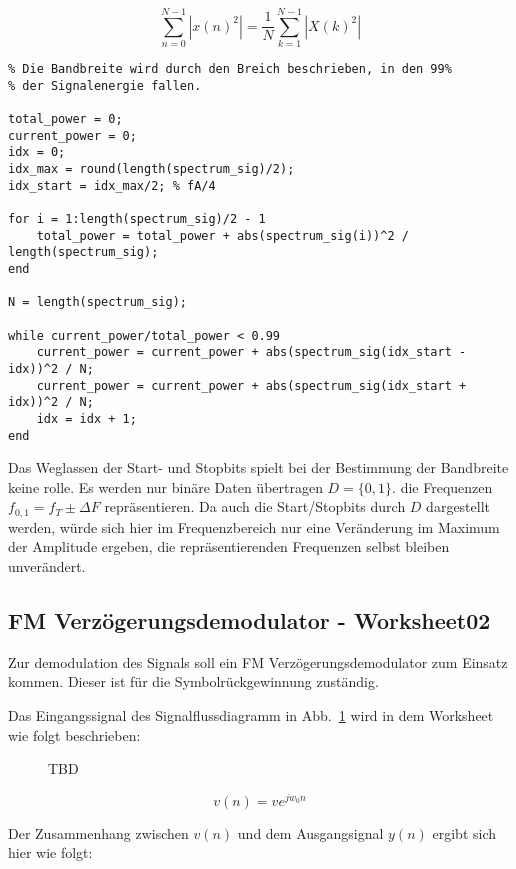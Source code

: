 \documentclass{article}
\begin{document}
$$
\sum_{n = 0}^{N - 1}\left\lvert x(n)^2\right\rvert =  \frac{1}{N} \sum_{k = 1}^{N-1}  \left\lvert X(k)^2\right\rvert 
$$
\begin{listing}
\begin{verbatim}
% Die Bandbreite wird durch den Breich beschrieben, in den 99%
% der Signalenergie fallen.

total_power = 0;
current_power = 0;
idx = 0;
idx_max = round(length(spectrum_sig)/2);
idx_start = idx_max/2; % fA/4

for i = 1:length(spectrum_sig)/2 - 1
    total_power = total_power + abs(spectrum_sig(i))^2 / length(spectrum_sig);
end

N = length(spectrum_sig);

while current_power/total_power < 0.99
    current_power = current_power + abs(spectrum_sig(idx_start - idx))^2 / N;
    current_power = current_power + abs(spectrum_sig(idx_start + idx))^2 / N;
    idx = idx + 1;
end
\end{verbatim}
\end{listing}

Das Weglassen der Start- und Stopbits spielt bei der Bestimmung der Bandbreite keine rolle.
Es werden nur binäre Daten übertragen $D = \{0, 1\}$. die Frequenzen $ f_{0, 1} = f_T \pm \varDelta F $ repräsentieren. 
Da auch die Start/Stopbits durch $D$ dargestellt werden, würde sich hier im Frequenzbereich
nur eine Veränderung im Maximum der Amplitude ergeben, die repräsentierenden Frequenzen selbst bleiben unverändert.

\subsection{FM Verzögerungsdemodulator - Worksheet02}
Zur demodulation des Signals soll ein FM Verzögerungsdemodulator zum Einsatz kommen. Dieser ist für die Symbolrückgewinnung zuständig. 

Das Eingangssignal des Signalflussdiagramm in Abb.~\ref{fig:fm-verz} wird in dem Worksheet wie folgt beschrieben:

\begin{figure}[!h]
    \centering
    \def\svgscale{0.5}
    \def\svgwidth{\columnwidth}
    \caption{TBD}
    \label{fig:fm-verz}
\end{figure}


$$
v(n) = v e^{j w_0 n}
$$

Der Zusammenhang zwischen $v(n)$ und dem Ausgangsignal $y(n)$ ergibt sich hier wie folgt:
\end{document}
